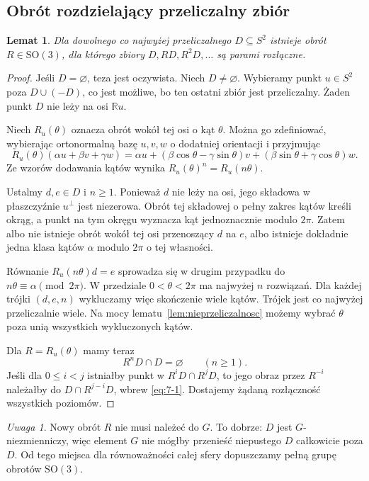 \documentclass[11pt,a4paper]{article}
\numberwithin{equation}{section}
\theoremstyle{plain}
\newtheorem{lemat}[twierdzenie]{Lemat}
\theoremstyle{definition}
\theoremstyle{remark}
\newtheorem{uwaga}[twierdzenie]{Uwaga}
\newcommand{\R}{\mathbb R}
\begin{document}
\subsection{Obrót rozdzielający przeliczalny zbiór}
\begin{lemat}\label{lem:obrot-rozdzielajacy}
Dla dowolnego co najwyżej przeliczalnego $D\subseteq S^2$ istnieje obrót $R\in\mathrm{SO}(3)$, dla którego zbiory $D,RD,R^2D,\ldots$ są parami rozłączne.
\end{lemat}
\begin{proof}
Jeśli $D=\varnothing$, teza jest oczywista. Niech $D\ne\varnothing$. Wybieramy punkt $u\in S^2$ poza $D\cup(-D)$, co jest możliwe, bo ten ostatni zbiór jest przeliczalny. Żaden punkt $D$ nie leży na osi $\R u$.

Niech $R_u(\theta)$ oznacza obrót wokół tej osi o kąt $\theta$. Można go zdefiniować, wybierając ortonormalną bazę $u,v,w$ o dodatniej orientacji i przyjmując
\[
 R_u(\theta)(\alpha u+\beta v+\gamma w)=\alpha u+
 (\beta\cos\theta-\gamma\sin\theta)v+
 (\beta\sin\theta+\gamma\cos\theta)w.
\]
Ze wzorów dodawania kątów wynika $R_u(\theta)^n=R_u(n\theta)$.

Ustalmy $d,e\in D$ i $n\ge1$. Ponieważ $d$ nie leży na osi, jego składowa w płaszczyźnie $u^\perp$ jest niezerowa. Obrót tej składowej o pełny zakres kątów kreśli okrąg, a punkt na tym okręgu wyznacza kąt jednoznacznie modulo $2\pi$. Zatem albo nie istnieje obrót wokół tej osi przenoszący $d$ na $e$, albo istnieje dokładnie jedna klasa kątów $\alpha$ modulo $2\pi$ o tej własności.

Równanie $R_u(n\theta)d=e$ sprowadza się w drugim przypadku do $n\theta\equiv\alpha\pmod{2\pi}$. W przedziale $0<\theta<2\pi$ ma najwyżej $n$ rozwiązań. Dla każdej trójki $(d,e,n)$ wykluczamy więc skończenie wiele kątów. Trójek jest co najwyżej przeliczalnie wiele. Na mocy lematu~\ref{lem:nieprzeliczalnosc} możemy wybrać $\theta$ poza unią wszystkich wykluczonych kątów.

Dla $R=R_u(\theta)$ mamy teraz
\begin{equation}\label{eq:7-1}
 R^nD\cap D=\varnothing\qquad(n\ge1).
\end{equation}
Jeśli dla $0\le i<j$ istniałby punkt w $R^iD\cap R^jD$, to jego obraz przez $R^{-i}$ należałby do $D\cap R^{j-i}D$, wbrew \eqref{eq:7-1}. Dostajemy żądaną rozłączność wszystkich poziomów.
\end{proof}
\begin{uwaga}
Nowy obrót $R$ nie musi należeć do $G$. To dobrze: $D$ jest $G$-niezmienniczy, więc element $G$ nie mógłby przenieść niepustego $D$ całkowicie poza $D$. Od tego miejsca dla równoważności całej sfery dopuszczamy pełną grupę obrotów $\mathrm{SO}(3)$.
\end{uwaga}
\end{document}

